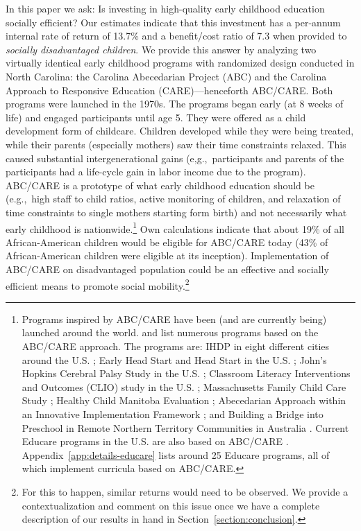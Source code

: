 \noindent In this paper we ask: Is investing in high-quality early childhood education socially efficient? Our estimates indicate that this investment has a per-annum internal rate of return of 13.7\% and a benefit/cost ratio of 7.3 when provided to \textit{socially disadvantaged children}. We provide this answer by analyzing two virtually identical early childhood programs with randomized design conducted in North Carolina: the Carolina Abecedarian Project (ABC) and the Carolina Approach to Responsive Education (CARE)---henceforth ABC/CARE. Both programs were launched in the 1970s. The programs began early (at 8 weeks of life) and engaged participants until age 5. They were offered as a child development form of childcare. Children developed while they were being treated, while their parents (especially mothers) saw their time constraints relaxed. This caused substantial intergenerational gains (e,g.,\ participants and parents of the participants had a life-cycle gain in labor income due to the program).\\

\noindent ABC/CARE is a prototype of what early childhood education should be (e.g.,\ high staff to child ratios, active monitoring of children, and relaxation of time constraints to single mothers starting form birth) and not necessarily what early childhood is nationwide.\footnote{Programs inspired by ABC/CARE have been (and are currently being) launched around the world. \citet{Sparling_2010_Highlights} and \citet{Ramey_Ramey_Lanzi_2014_Interventions} list numerous programs based on the ABC/CARE approach. The programs are: IHDP in eight different cities around the U.S. \citep{Spiker-etal_1997_Helping}; Early Head Start and Head Start in the U.S. \citep{Schneider_McDonald-eds_2007_Scale-Up_Vol-1}; John's Hopkins Cerebral Palsy Study in the U.S. \citep{Sparling_2010_Highlights}; Classroom Literacy Interventions and Outcomes (CLIO) study in the U.S. \citep{Sparling_2010_Highlights}; Massachusetts Family Child Care Study \citep{Collins_etal_2010_Massachusetts-Study}; Healthy Child Manitoba Evaluation \citep{Healthy_Child_Manitoba_2015_Starting-Early}; Abecedarian Approach within an Innovative Implementation Framework \citep{Jensen_Nielsen_2016_ABC-Programme-Pilot}; and Building a Bridge into Preschool in Remote Northern Territory Communities in Australia \citep{UMonash_Dataset_2015_URL}. Current Educare programs in the U.S. are also based on ABC/CARE \citep{Educare_2014_Research_Agenda,Yazejian_Bryant_2012_Educare}. Appendix~\ref{app:details-educare} lists around 25 Educare programs, all of which implement curricula based on ABC/CARE.} Own calculations indicate that about 19\% of all African-American children would be eligible for ABC/CARE today (43\% of African-American children were eligible at its inception). Implementation of ABC/CARE on disadvantaged population could be an effective and socially efficient means to promote social mobility.\footnote{For this to happen, similar returns would need to be observed. We provide a contextualization and comment on this issue once we have a complete description of our results in hand in Section~\ref{section:conclusion}.}\\
 
